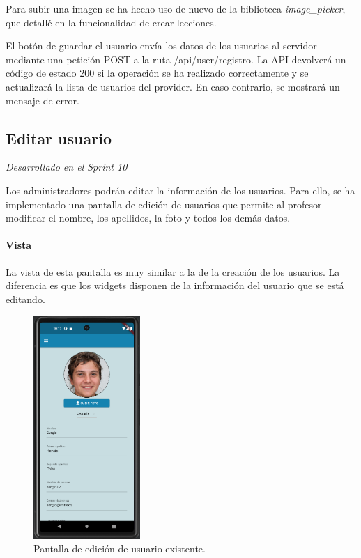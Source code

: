 Para subir una imagen se ha hecho uso de nuevo de la biblioteca \textit{image\_picker}, que detallé en la funcionalidad de crear lecciones.

El botón de guardar el usuario envía los datos de los usuarios al servidor mediante una petición POST a la ruta /api/user/registro. 
La API devolverá un código de estado 200 si la operación se ha realizado correctamente y se actualizará la lista de usuarios del provider. 
En caso contrario, se mostrará un mensaje de error.

\newpage

\subsection{Editar usuario} 

\textit{Desarrollado en el Sprint 10}

Los administradores podrán editar la información de los usuarios. Para ello, se ha implementado una pantalla de edición de usuarios 
que permite al profesor modificar el nombre, los apellidos, la foto y todos los demás datos.

\paragraph*{Vista}
La vista de esta pantalla es muy similar a la de la creación de los usuarios. La diferencia es que los widgets disponen de la información del usuario que se está editando.

\begin{figure}[H]
  \centering
  \includegraphics[width=0.36\textwidth]{imagenes/c7/editarusuario.png}
  \caption{Pantalla de edición de usuario existente.} 
  \label{fig:edicion_usuario}
\end{figure}


